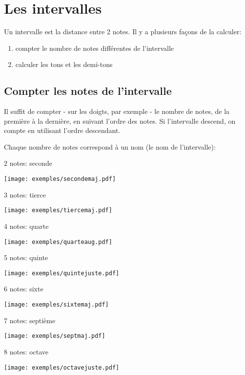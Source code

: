 \chapter{Les intervalles}

Un intervalle est la distance entre 2 notes. Il y a plusieurs façons de la calculer:

\begin{enumerate}
\item compter le nombre de notes différentes de l'intervalle
\item calculer les tons et les demi-tons
\end{enumerate}

\section{Compter les notes de l'intervalle}
Il suffit de compter - sur les doigts, par exemple - le nombre de notes, de la première à la dernière, en suivant l'ordre des notes. Si l'intervalle descend, on compte en utilisant l'ordre descendant.

Chaque nombre de notes correspond à un nom (le nom de l'intervalle):
\begin{description}
\item 2 notes: seconde 
\item \texttt{[image: exemples/secondemaj.pdf]}
\item 3 notes: tierce
\item \texttt{[image: exemples/tiercemaj.pdf]}
\item 4 notes: quarte
\item \texttt{[image: exemples/quarteaug.pdf]}
\item 5 notes: quinte
\item \texttt{[image: exemples/quintejuste.pdf]}
\item 6 notes: sixte
\item \texttt{[image: exemples/sixtemaj.pdf]}
\item 7 notes: septième
\item \texttt{[image: exemples/septmaj.pdf]}
\item 8 notes: octave
\item \texttt{[image: exemples/octavejuste.pdf]}
\end{description}

